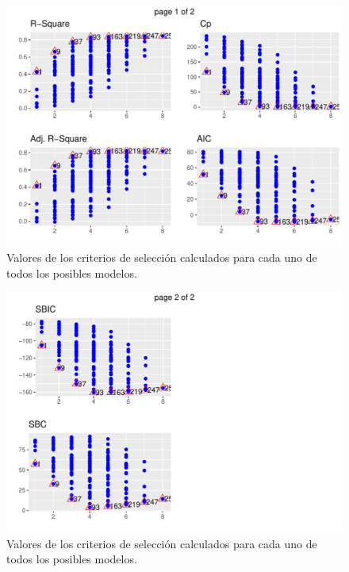 \documentclass[
]{article}
\begin{document}
\begin{figure}

{\centering \includegraphics{MLG2_files/figure-latex/surgicalFitAllPlot-1} 

}

\caption{Valores de los criterios de selección calculados para cada uno de todos los posibles modelos.}\label{fig:surgicalFitAllPlot-1}
\end{figure}
\begin{figure}

{\centering \includegraphics{MLG2_files/figure-latex/surgicalFitAllPlot-2} 

}

\caption{Valores de los criterios de selección calculados para cada uno de todos los posibles modelos.}\label{fig:surgicalFitAllPlot-2}
\end{figure}
\end{document}
